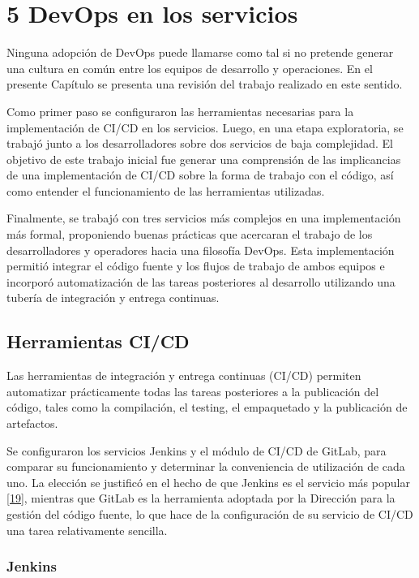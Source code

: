 \chapter{5 DevOps en los servicios}

Ninguna adopción de DevOps puede llamarse como tal si no pretende
generar una cultura en común entre los equipos de desarrollo y
operaciones. En el presente Capítulo se presenta una revisión del
trabajo realizado en este sentido.

Como primer paso se configuraron las herramientas necesarias para la
implementación de CI/CD en los servicios. Luego, en una etapa
exploratoria, se trabajó junto a los desarrolladores sobre dos
servicios de baja complejidad. El objetivo de este trabajo inicial fue
generar una comprensión de las implicancias de una implementación de
CI/CD sobre la forma de trabajo con el código, así como entender el
funcionamiento de las herramientas utilizadas.

Finalmente, se trabajó con tres servicios más complejos en una
implementación más formal, proponiendo buenas prácticas que acercaran
el trabajo de los desarrolladores y operadores hacia una filosofía
DevOps. Esta implementación permitió integrar el código fuente y los
flujos de trabajo de ambos equipos e incorporó automatización de las
tareas posteriores al desarrollo utilizando una tubería de integración
y entrega continuas.

\section{Herramientas CI/CD}

Las herramientas de integración y entrega continuas (CI/CD) permiten
automatizar prácticamente todas las tareas posteriores a la
publicación del código, tales como la compilación, el testing, el
empaquetado y la publicación de artefactos.

Se configuraron los servicios Jenkins y el módulo de CI/CD de GitLab,
para comparar su funcionamiento y determinar la conveniencia de
utilización de cada uno. La elección se justificó en el hecho de que
Jenkins es el servicio más popular
\href{https://www.zotero.org/google-docs/?VQPh0a}{[19]}, mientras que
GitLab es la herramienta adoptada por la Dirección para la gestión del
código fuente, lo que hace de la configuración de su servicio de CI/CD
una tarea relativamente sencilla.

\subsection{Jenkins}

